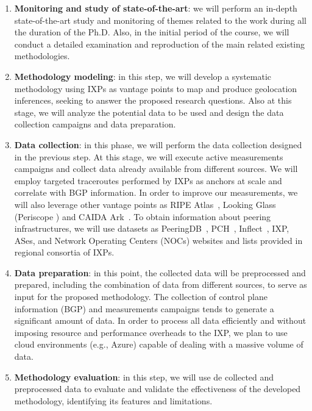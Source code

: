 \begin{enumerate}
\item {\bf Monitoring and study of state-of-the-art}: we will perform an in-depth state-of-the-art study and monitoring of themes related to the work during all the duration of the Ph.D. Also, in the initial period of the course, we will conduct a detailed examination and reproduction of the main related existing methodologies.

\item {\bf Methodology modeling}: in this step, we will develop a systematic methodology using IXPs as vantage points to map and produce geolocation inferences, seeking to answer the proposed research questions. Also at this stage, we will analyze the potential data to be used and design the data collection campaigns and data preparation.

\item {\bf Data collection}: in this phase, we will perform the data collection designed in the previous step. At this stage, we will execute active measurements campaigns and collect data already available from different sources. We will employ targeted traceroutes performed by IXPs as anchors at scale and correlate with BGP information. In order to improve our measurements, we will also leverage other vantage points as RIPE Atlas~\cite{ripeatlas}, Looking Glass (Periscope \cite{Periscope}) and CAIDA Ark~\cite{ark}. To obtain information about peering infrastructures, we will use datasets as PeeringDB~\cite{peeringDB}, PCH~\cite{pch}, Inflect~\cite{inflect}, IXP, ASes, and Network Operating Centers (NOCs) websites and lists provided in regional consortia of IXPs.

\item {\bf Data preparation}: in this point, the collected data will be preprocessed and prepared, including the combination of data from different sources, to serve as input for the proposed methodology. The collection of control plane information (BGP) and measurements campaigns tends to generate a significant amount of data. In order to process all data efficiently and without imposing resource and performance overheads to the IXP, we plan to use cloud environments (e.g., Azure) capable of dealing with a massive volume of data.

\item {\bf Methodology evaluation}: in this step, we will use de collected and preprocessed data to evaluate and validate the effectiveness of the developed methodology, identifying its features and limitations.


\end{enumerate}
